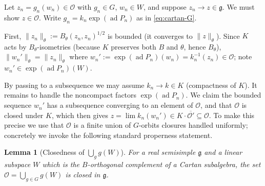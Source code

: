 \documentclass{amsart}
\newtheorem{lemma}{Lemma}
\theoremstyle{definition}
\begin{document}
Let $z_n=g_n(w_n)\in\mathcal O$ with $g_n\in G$, $w_n\in W$, and suppose
$z_n\to z\in\mathfrak g$. We must show $z\in\mathcal O$. Write
$g_n=k_n\exp(\operatorname{ad}P_n)$ as in \eqref{eq:cartan-G}.

First, $\|z_n\|_\theta:=B_\theta(z_n,z_n)^{1/2}$ is bounded (it converges to
$\|z\|_\theta$). Since $K$ acts by $B_\theta$-isometries (because $K$ preserves both
$B$ and $\theta$, hence $B_\theta$), $\|w_n'\|_\theta=\|z_n\|_\theta$ where
$w_n':=\exp(\operatorname{ad}P_n)(w_n)=k_n^{-1}(z_n)\in\mathcal O$; note
$w_n'\in\exp(\operatorname{ad}P_n)(W)$.

By passing to a subsequence we may assume $k_n\to k\in K$ (compactness of $K$).
It remains to handle the noncompact factors $\exp(\operatorname{ad}P_n)$. We claim
the bounded sequence $w_n'$ has a subsequence converging to an element of
$\mathcal O$, and that $\mathcal O$ is closed under $K$, which then gives
$z=\lim k_n(w_n')\in K\cdot\overline{\mathcal O'}\subseteq\mathcal O$. To make this
precise we use that $\mathcal O$ is a finite union of $G$-orbits closures handled
uniformly; concretely we invoke the following standard properness statement.

\begin{lemma}[Closedness of $\bigcup_g g(W)$]\label{lem:closed}
For a real semisimple $\mathfrak g$ and a linear subspace $W$ which is the
$B$-orthogonal complement of a Cartan subalgebra, the set $\mathcal O=\bigcup_{g\in
G} g(W)$ is closed in $\mathfrak g$.
\end{lemma}
\end{document}
